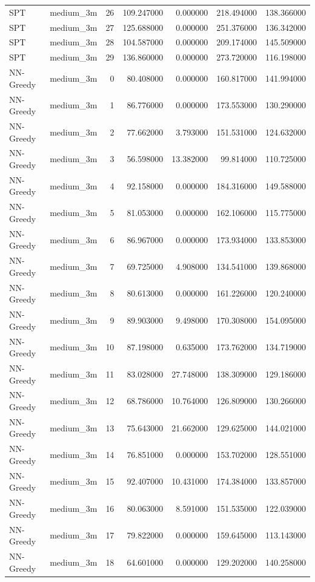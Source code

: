 \begin{tabular}{llrrrrr}
SPT & medium_3m & 26 & 109.247000 & 0.000000 & 218.494000 & 138.366000 \\
SPT & medium_3m & 27 & 125.688000 & 0.000000 & 251.376000 & 136.342000 \\
SPT & medium_3m & 28 & 104.587000 & 0.000000 & 209.174000 & 145.509000 \\
SPT & medium_3m & 29 & 136.860000 & 0.000000 & 273.720000 & 116.198000 \\
NN-Greedy & medium_3m & 0 & 80.408000 & 0.000000 & 160.817000 & 141.994000 \\
NN-Greedy & medium_3m & 1 & 86.776000 & 0.000000 & 173.553000 & 130.290000 \\
NN-Greedy & medium_3m & 2 & 77.662000 & 3.793000 & 151.531000 & 124.632000 \\
NN-Greedy & medium_3m & 3 & 56.598000 & 13.382000 & 99.814000 & 110.725000 \\
NN-Greedy & medium_3m & 4 & 92.158000 & 0.000000 & 184.316000 & 149.588000 \\
NN-Greedy & medium_3m & 5 & 81.053000 & 0.000000 & 162.106000 & 115.775000 \\
NN-Greedy & medium_3m & 6 & 86.967000 & 0.000000 & 173.934000 & 133.853000 \\
NN-Greedy & medium_3m & 7 & 69.725000 & 4.908000 & 134.541000 & 139.868000 \\
NN-Greedy & medium_3m & 8 & 80.613000 & 0.000000 & 161.226000 & 120.240000 \\
NN-Greedy & medium_3m & 9 & 89.903000 & 9.498000 & 170.308000 & 154.095000 \\
NN-Greedy & medium_3m & 10 & 87.198000 & 0.635000 & 173.762000 & 134.719000 \\
NN-Greedy & medium_3m & 11 & 83.028000 & 27.748000 & 138.309000 & 129.186000 \\
NN-Greedy & medium_3m & 12 & 68.786000 & 10.764000 & 126.809000 & 130.266000 \\
NN-Greedy & medium_3m & 13 & 75.643000 & 21.662000 & 129.625000 & 144.021000 \\
NN-Greedy & medium_3m & 14 & 76.851000 & 0.000000 & 153.702000 & 128.551000 \\
NN-Greedy & medium_3m & 15 & 92.407000 & 10.431000 & 174.384000 & 133.857000 \\
NN-Greedy & medium_3m & 16 & 80.063000 & 8.591000 & 151.535000 & 122.039000 \\
NN-Greedy & medium_3m & 17 & 79.822000 & 0.000000 & 159.645000 & 113.143000 \\
NN-Greedy & medium_3m & 18 & 64.601000 & 0.000000 & 129.202000 & 140.258000 \\

\end{tabular}
